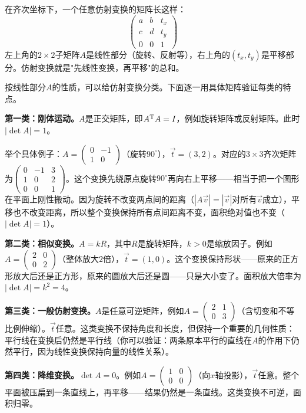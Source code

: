 
在齐次坐标下，一个任意仿射变换的矩阵长这样：
\[
\begin{pmatrix}
a&b&t_x\\
c&d&t_y\\
0&0&1
\end{pmatrix}
\]
左上角的$2\times2$子矩阵$A$是线性部分（旋转、反射等），右上角的$(t_x,t_y)$是平移部分。仿射变换就是"先线性变换，再平移"的总和。

按线性部分$A$的性质，可以给仿射变换分类。下面逐一用具体矩阵验证每类的特点。

\textbf{第一类：刚体运动。}$A$是正交矩阵，即$A^{\text T}A=I$，例如旋转矩阵或反射矩阵。此时$|\det A|=1$。

举个具体例子：$A=\begin{pmatrix}0&-1\\1&0\end{pmatrix}$（旋转$90^\circ$），$\vec t=(3,2)$。对应的$3\times3$齐次矩阵为$\begin{pmatrix}0&-1&3\\1&0&2\\0&0&1\end{pmatrix}$。这个变换先绕原点旋转$90^\circ$再向右上平移——相当于把一个图形在平面上刚性搬动。因为旋转不改变两点间的距离（$|A\vec v|=|\vec v|$对所有$\vec v$成立），平移也不改变距离，所以整个变换保持所有点间距离不变，面积绝对值也不变（$|\det A|=1$）。

\textbf{第二类：相似变换。}$A=kR$，其中$R$是旋转矩阵，$k>0$是缩放因子。例如$A=\begin{pmatrix}2&0\\0&2\end{pmatrix}$（整体放大$2$倍），$\vec t=(1,0)$。这个变换保持形状——原来的正方形放大后还是正方形，原来的圆放大后还是圆——只是大小变了。面积放大倍率为$|\det A|=k^2=4$。

\textbf{第三类：一般仿射变换。}$A$是任意可逆矩阵，例如$A=\begin{pmatrix}2&1\\0&3\end{pmatrix}$（含切变和不等比例伸缩）。$\vec t$任意。这类变换不保持角度和长度，但保持一个重要的几何性质：平行线在变换后仍然是平行线（你可以验证：两条原本平行的直线在$A$的作用下仍然平行，因为线性变换保持向量的线性关系）。

\textbf{第四类：降维变换。}$\det A=0$。例如$A=\begin{pmatrix}1&0\\0&0\end{pmatrix}$（向$x$轴投影），$\vec t$任意。整个平面被压扁到一条直线上，再平移——结果仍然是一条直线。这类变换不可逆，面积归零。


